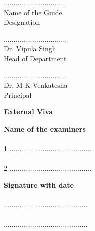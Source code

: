 \vspace{1.0cm}
\begin{minipage}[t]{0.3\textwidth}%
\small{\color{gray!50}................................}\\
{\color{red}Name of the Guide}\\
Designation\\
\end{minipage}\hspace{0.06cm}
\begin{minipage}[t]{0.3\textwidth}%
\small{\color{gray!50}................................}\\
{\color{red}Dr. Vipula Singh}\\
Head of Department\\
\end{minipage}
\begin{minipage}[t]{0.3\textwidth}%
\small{\color{gray!50}................................}\\
{\color{red}Dr. M K Venkatesha}\\
Principal\\
\end{minipage}

\begin{center}
	\textbf{{\color{blue}External Viva}}
\end{center}

\vspace{0.1cm}
\begin{minipage}[t]{0.6\textwidth}%
\textbf{Name of the examiners}\\\\
1 \small{\color{gray!50}..........................................}\\
\\
2 \small{\color{gray!50}..........................................}\\
\end{minipage}\hspace{0.06cm}
\begin{minipage}[t]{0.6\textwidth}%
\textbf{Signature with date}\\\\
 \small{\color{gray!50}...........................................}\\
\\
 \small{\color{gray!50}...........................................}\\
\end{minipage}
